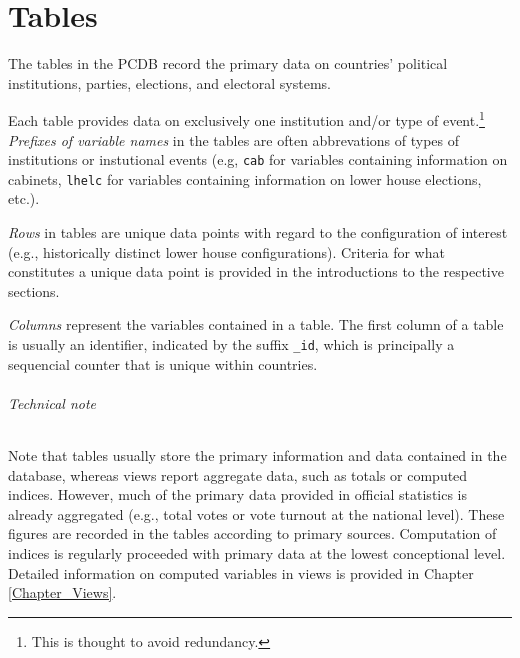 \chapter{Tables}\label{chap_tables}

The tables in the PCDB record the primary data on countries' political institutions, parties, elections, and electoral systems.

Each table provides data on exclusively one institution and/or type of event.\footnote{This is thought to avoid redundancy.} 
\emph{Prefixes of variable names} in the tables are often abbrevations of types of institutions or instutional events (e.g, \texttt{\footnotesize cab} for variables containing information on cabinets, \texttt{\footnotesize lhelc} for variables containing information on lower house elections, etc.). 

\emph{Rows} in tables are unique data points with regard to the configuration of interest (e.g., historically distinct lower house configurations). Criteria for what constitutes a unique data point is provided in the introductions to the respective sections. 

\emph{Columns} represent the variables contained in a table. 
The first column of a table is usually an identifier, indicated by the suffix \texttt{\footnotesize \_id}, which is principally a sequencial counter that is unique within countries.

\subparagraph{Technical note}
Note that tables usually store the primary information and data contained in the database, whereas views report aggregate data, such as totals or computed indices.
However, much of the primary data provided in official statistics is already aggregated (e.g., total votes or vote turnout at the national level). 
These figures are recorded in the tables according to primary sources.
Computation of indices is regularly proceeded with primary data at the lowest conceptional level. Detailed information on computed variables in views is provided in Chapter \ref{Chapter_Views}.
 